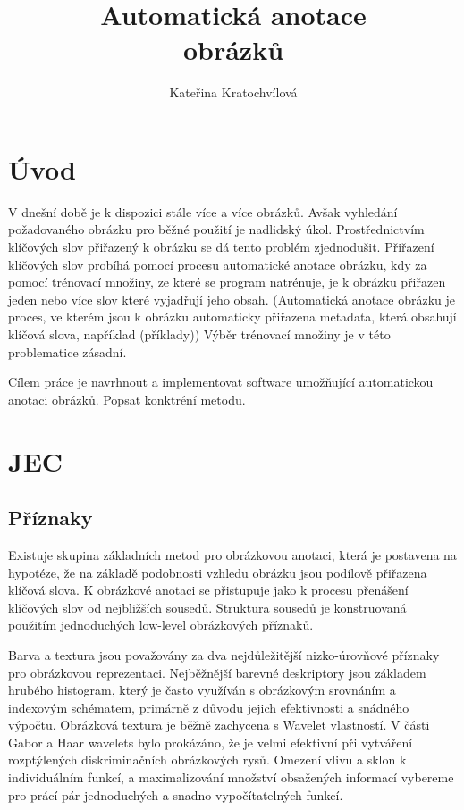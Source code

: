 \documentclass[czech,BP]{thesiskiv}
\author{Kateřina Kratochvílová}
\title{Automatická anotace\\obrázků}
\begin{document}
%
\maketitle
\tableofcontents

\chapter{Úvod}

V dnešní době je k dispozici stále více a více obrázků. Avšak vyhledání požadovaného obrázku pro běžné použití je nadlidský úkol. Prostřednictvím klíčových slov přiřazený k obrázku se dá tento problém zjednodušit. Přiřazení klíčových slov probíhá pomocí procesu automatické anotace obrázku, kdy za pomocí trénovací množiny, ze které se program natrénuje, je k obrázku přiřazen jeden nebo více slov které vyjadřují jeho obsah. (Automatická anotace obrázku je proces, ve kterém jsou k obrázku automaticky přiřazena metadata, která obsahují klíčová slova, například (příklady)) Výběr trénovací množiny je v této problematice zásadní. 

Cílem práce je navrhnout a implementovat software umožňující automatickou anotaci obrázků. Popsat konktréní metodu.

 
% 
%

{\raggedright\small

}

\chapter{JEC}
\section{Příznaky}
Existuje skupina základních metod pro obrázkovou anotaci, která je postavena na hypotéze, že na základě podobnosti vzhledu obrázku jsou podílově přiřazena klíčová slova. K obrázkové anotaci se přistupuje jako k procesu přenášení klíčových slov od nejbližších sousedů. Struktura sousedů je konstruovaná použitím jednoduchých low-level obrázkových příznaků.

Barva a textura jsou považovány za dva nejdůležitější nizko-úrovňové příznaky pro obrázkovou reprezentaci. Nejběžnější barevné deskriptory jsou základem hrubého histogram, který je často využíván s obrázkovým srovnáním a indexovým schématem, primárně z důvodu jejich efektivnosti a snádného výpočtu. Obrázková textura je běžně zachycena s Wavelet vlastností. V části Gabor a Haar wavelets bylo prokázáno, že je velmi efektivní při vytváření rozptýlených diskriminačních obrázkových rysů. Omezení vlivu a sklon k individuálním funkcí, a maximalizování množství obsažených informací vybereme pro prácí pár jednoduchých a snadno vypočítatelných funkcí. 
\end{document}
